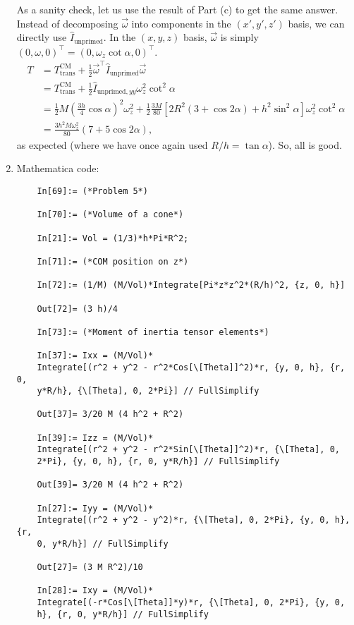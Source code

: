 \documentclass{article}
\theoremstyle{definition}
\newcommand{\al}{\alpha}
\newcommand{\f}[2]{\frac{#1}{#2}}
\newcommand{\lp}{\left(}
\newcommand{\rp}{\right)}
\newcommand{\lb}{\left[}
\newcommand{\rb}{\right]}
\begin{document}
\begin{enumerate}[label=(\alph*)]
	
	As a sanity check, let us use the result of Part (c) to get the same answer. Instead of decomposing $\vec{\omega}$ into components in the $(x',y',z')$ basis, we can directly use $\hat{I}_\text{unprimed}$. In the $(x,y,z)$ basis, $\vec{\omega}$ is simply $(0,\omega,0)^\top = (0,\omega_z \cot\al ,0)^\top$. 
	\begin{align*}
	T 
	&= T_{\text{trans}}^\text{CM} + \f{1}{2}\vec{\omega}^\top \hat{I}_\text{unprimed} \vec{\omega}\\
	&= T_{\text{trans}}^\text{CM} + \f{1}{2} \hat{I}_{\text{unprimed},yy}\omega_z^2 \cot^2\al \\
	&= \f{1}{2} M \lp \f{3h}{4}\cos\al \rp^2 \omega_z^2 
	+ \f{1}{2} \f{3M}{80} \lb 2R^2(3+\cos 2\al) + h^2 \sin^2\al \rb \omega_z^2 \cot^2\al \\
	&= \f{3h^2 M \omega_z^2}{80}\lp 7 + 5\cos 2\al \rp,
	\end{align*}
	as expected (where we have once again used $R/h=\tan \al$). So, all is good.
	
	\item Mathematica code:
	\begin{lstlisting}
	In[69]:= (*Problem 5*)
	
	In[70]:= (*Volume of a cone*)
	
	In[21]:= Vol = (1/3)*h*Pi*R^2;
	
	In[71]:= (*COM position on z*)
	
	In[72]:= (1/M) (M/Vol)*Integrate[Pi*z*z^2*(R/h)^2, {z, 0, h}]
	
	Out[72]= (3 h)/4
	
	In[73]:= (*Moment of inertia tensor elements*)
	
	In[37]:= Ixx = (M/Vol)*
	Integrate[(r^2 + y^2 - r^2*Cos[\[Theta]]^2)*r, {y, 0, h}, {r, 0, 
	y*R/h}, {\[Theta], 0, 2*Pi}] // FullSimplify
	
	Out[37]= 3/20 M (4 h^2 + R^2)
	
	In[39]:= Izz = (M/Vol)*
	Integrate[(r^2 + y^2 - r^2*Sin[\[Theta]]^2)*r, {\[Theta], 0, 
	2*Pi}, {y, 0, h}, {r, 0, y*R/h}] // FullSimplify
	
	Out[39]= 3/20 M (4 h^2 + R^2)
	
	In[27]:= Iyy = (M/Vol)*
	Integrate[(r^2 + y^2 - y^2)*r, {\[Theta], 0, 2*Pi}, {y, 0, h}, {r, 
	0, y*R/h}] // FullSimplify
	
	Out[27]= (3 M R^2)/10
	
	In[28]:= Ixy = (M/Vol)*
	Integrate[(-r*Cos[\[Theta]]*y)*r, {\[Theta], 0, 2*Pi}, {y, 0, 
	h}, {r, 0, y*R/h}] // FullSimplify
	

\end{lstlisting}
\end{enumerate}
\end{document}
